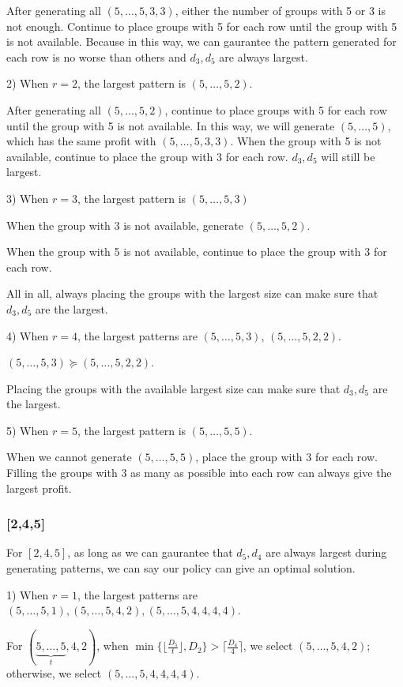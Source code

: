 After generating all $(5,\ldots,5,3,3)$, either the number of groups with 5 or 3 is not enough. Continue to place groups with 5 for each row until the group with 5 is not available. Because in this way, we can gaurantee the pattern generated for each row is no worse than others and $d_3,d_5$ are always largest.

2) When $r=2$, the largest pattern is $(5,\ldots,5,2)$.

After generating all $(5,\ldots,5,2)$, continue to place groups with 5 for each row until the group with 5 is not available. In this way, we will generate $(5,\ldots,5)$, which has the same profit with $(5,\ldots,5,3,3)$.
When the group with 5 is not available, continue to place the group with 3 for each row. $d_3,d_5$ will still be largest.

3) When $r=3$, the largest pattern is $(5,\ldots,5,3)$

When the group with 3 is not available, generate $(5,\ldots,5,2)$.

When the group with 5 is not available, continue to place the group with 3 for each row.

All in all, always placing the groups with the largest size can make sure that
$d_3,d_5$ are the largest.

4) When $r=4$, the largest patterns are $(5,\ldots,5,3)$, $(5,\ldots,5,2,2)$.

$(5,\ldots,5,3) \succeq (5,\ldots,5,2,2)$.

Placing the groups with the available largest size can make sure that $d_3,d_5$ are the largest.

5) When $r=5$, the largest pattern is $(5,\ldots,5,5)$.

When we cannot generate $(5,\ldots,5,5)$, place the group with 3 for each row. Filling the groups with 3 as many as possible into each row can always give the largest profit.

\subsubsection{[2,4,5]}

For $[2,4,5]$, as long as we can gaurantee that $d_5,d_4$ are always largest during generating patterns, we can say our policy can give an optimal solution.

1) When $r = 1$, the largest patterns are $(5,\ldots,5,1), (5,\ldots,5,4,2), (5,\ldots,5,4,4,4,4)$.

For $(\underbrace{5,\ldots,5}_{t},4,2)$, when $\min\{\lfloor \frac{D_5}{t} \rfloor, D_2\} > \lceil \frac{D_4}{4} \rceil$, we select $(5,\ldots,5,4,2)$; otherwise, we select $(5,\ldots,5,4,4,4,4)$.

